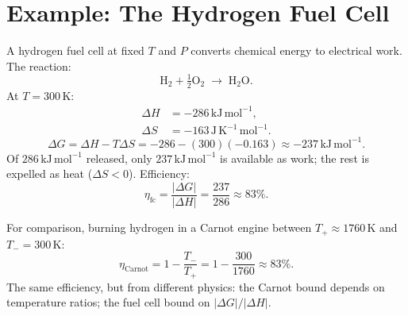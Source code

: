 \section{Example: The Hydrogen Fuel Cell}

\begin{example}
A hydrogen fuel cell at fixed $T$ and $P$ converts chemical energy to electrical work. The reaction:
\begin{equation}
    \mathrm{H_2} + \tfrac{1}{2}\mathrm{O_2} \;\longrightarrow\; \mathrm{H_2O}.
\end{equation}
At $T = 300\,\mathrm{K}$:
\begin{align}
    \Delta H &= -286\,\mathrm{kJ\,mol^{-1}}, \\
    \Delta S &= -163\,\mathrm{J\,K^{-1}\,mol^{-1}}.
\end{align}
\begin{equation}
    \Delta G = \Delta H - T\Delta S = -286 - (300)(-0.163) \approx -237\,\mathrm{kJ\,mol^{-1}}.
\end{equation}
Of $286\,\mathrm{kJ\,mol^{-1}}$ released, only $237\,\mathrm{kJ\,mol^{-1}}$ is available as work; the rest is expelled as heat ($\Delta S < 0$). Efficiency:
\begin{equation}
    \eta_{\mathrm{fc}} = \frac{|\Delta G|}{|\Delta H|} = \frac{237}{286} \approx 83\%.
\end{equation}

For comparison, burning hydrogen in a Carnot engine between $T_+ \approx 1760\,\mathrm{K}$ and $T_- = 300\,\mathrm{K}$:
\begin{equation}
    \eta_{\mathrm{Carnot}} = 1 - \frac{T_-}{T_+} = 1 - \frac{300}{1760} \approx 83\%.
\end{equation}
The same efficiency, but from different physics: the Carnot bound depends on temperature ratios; the fuel cell bound on $|\Delta G|/|\Delta H|$.
\end{example}
